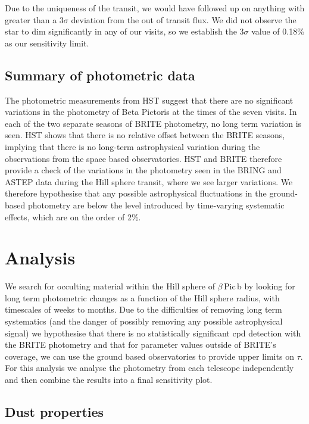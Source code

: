 \documentclass[longauth]{aa} %
\newcommand{\bpb}{$\beta$\,Pic\,b}
\begin{document}
Due to the uniqueness of the transit, we would have followed up on anything with greater than a 3$\sigma$ deviation from the out of transit flux.
%
We did not observe the star to dim significantly in any of our visits, so we establish the 3$\sigma$ value of 0.18\% as our sensitivity limit.

\subsection{Summary of photometric data}

The photometric measurements from HST suggest that there are no significant variations in the photometry of Beta Pictoris at the times of the seven visits.
%
In each of the two separate seasons of BRITE photometry, no long term variation is seen.
%
HST shows that there is no relative offset between the BRITE seasons, implying that there is no long-term astrophysical variation during the observations from the space based observatories.
%
%
HST and BRITE therefore provide a check of the variations in the photometry seen in the BRING and ASTEP data during the Hill sphere transit, where we see larger variations.
%
We therefore hypothesise that any possible astrophysical fluctuations in the ground-based photometry are below the level introduced by time-varying systematic effects, which are on the order of 2\%.

\section{Analysis}\label{sec:analysis}

We search for occulting material within the Hill sphere of \bpb{} by looking for long term photometric changes as a function of the Hill sphere radius, with timescales of weeks to months.
%
Due to the difficulties of removing long term systematics (and the danger of possibly removing any possible astrophysical signal) we hypothesise that there is no statistically significant \ac{cpd} detection with the BRITE photometry and that for parameter values outside of BRITE's coverage, we can use the ground based observatories to provide upper limits on $\tau$.
%
For this analysis we analyse the photometry from each telescope independently and then combine the results into a final sensitivity plot.

\subsection{Dust properties}\label{dust}
\end{document}
